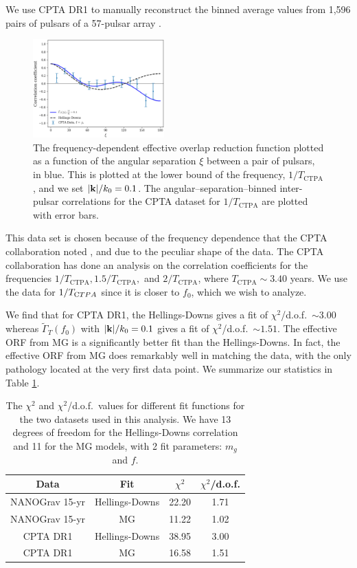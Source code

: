 \documentclass[prd,twocolumn,aps,psfig,nofootinbib,nobibnotes,superscriptaddress,preprintnumbers,times]{revtex4-2}
\begin{document}
We use CPTA DR1 to manually reconstruct the binned average values from 1,596 pairs of pulsars of a 57-pulsar array \cite{Xu:2023wog}. 
\begin{figure}[ht]
    \centering
    \includegraphics[width=0.45\textwidth]{fig3.pdf}
    \caption{The frequency-dependent effective overlap reduction function plotted as a function of the angular separation $\xi$ between a pair of pulsars, in blue. This is plotted at the lower bound of the frequency, $1/T_{\text{CTPA}}$, and we set $|{\bf k}|/k_0 = 0.1$. The angular–separation–binned inter-pulsar correlations for the CPTA dataset for $1/T_{\text{CTPA}}$ are plotted with error bars.}
    \label{fig:cpta}
\end{figure}
This data set is chosen because of the frequency dependence that the CPTA collaboration noted \cite{Xu:2023wog}, and due to the peculiar shape of the data. The CPTA collaboration has done an analysis on the correlation coefficients for the frequencies $1/T_{\text{CTPA}}, 1.5/T_{\text{CTPA}},$ and $2/T_{\text{CTPA}}$, where $T_{\text{CTPA}} \sim 3.40$ years. We use the data for $1/T_{\text CTPA}$ since it is closer to $f_0$, which we wish to analyze. 

We find that for CPTA DR1, the Hellings-Downs gives a fit of $\chi^2$/d.o.f.\ $\sim 3.00$ whereas $\tilde{\Gamma}_T(f_0)$ with $|{\bf k}|/k_0 = 0.1$ gives a fit of $\chi^2$/d.o.f.\ $\sim 1.51$. The effective ORF from MG  is a significantly better fit than the Hellings-Downs. In fact, the effective ORF from MG  does remarkably well in matching the data, with the only pathology located at the very first data point.
We summarize our statistics in Table \ref{tbl:chi}. 
\begin{table}[ht] 
\centering
\renewcommand{\arraystretch}{1.8}
\begin{tabular}{|c|c|c|c|}
\hline
\textbf{Data} & \textbf{Fit} & \textbf{$\chi^2$} & \textbf{$\chi^2$/d.o.f.} \\
\hline
NANOGrav 15-yr & Hellings-Downs & 22.20 & 1.71 \\
\hline
NANOGrav 15-yr & MG  & 11.22 & 1.02 \\
\hline
CPTA DR1 & Hellings-Downs & 38.95 & 3.00 \\
\hline
CPTA DR1 & MG  & 16.58 & 1.51 \\
\hline
\end{tabular}
\caption{The $\chi^2$ and $\chi^2$/d.o.f.\ values for different fit functions for the two datasets used in this analysis. We have 13 degrees of freedom for the Hellings-Downs correlation and 11 for the MG  models, with 2 fit parameters: $m_g$ and $f$. }
\label{tbl:chi}
\end{table}
\end{document}
